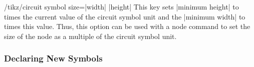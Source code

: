 \begin{key}{/tikz/circuit symbol size=|width|  |height|
    } 
  This key sets |minimum height| to  times the current
  value of the circuit symbol unit and the |minimum width| to
   times this value. Thus, this option can be used with a
  node command to set the size of the node as a multiple of the
  circuit symbol unit.
  
\begin{codeexample}[]
\end{codeexample}
\end{key}



\subsubsection{Declaring New Symbols}


